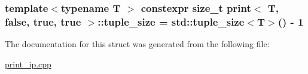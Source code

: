 \subsubsection[{\texorpdfstring{tuple\+\_\+size}{tuple_size}}]{\setlength{\rightskip}{0pt plus 5cm}template$<$typename T $>$ constexpr size\+\_\+t {\bf print}$<$ T, false, true, true $>$\+::tuple\+\_\+size = std\+::tuple\+\_\+size$<$T$>$() -\/ 1\hspace{0.3cm}{\ttfamily [static]}}\hypertarget{structprint_3_01T_00_01false_00_01true_00_01true_01_4_a9e916cb79c7ac38e78590d3c30b633e7}{}\label{structprint_3_01T_00_01false_00_01true_00_01true_01_4_a9e916cb79c7ac38e78590d3c30b633e7}


The documentation for this struct was generated from the following file\+:\begin{DoxyCompactItemize}
\item 
\hyperlink{print__ip_8cpp}{print\+\_\+ip.\+cpp}\end{DoxyCompactItemize}
